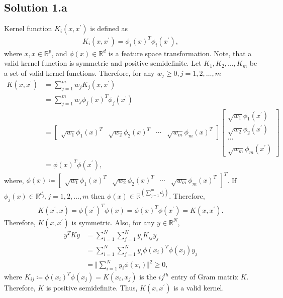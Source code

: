 \subsection*{Solution 1.a}
Kernel function $K_i(x, x^{\prime})$ is defined as
\begin{align*}
	K_i(x, x^{\prime}) = \phi_i(x)^T\phi_i(x^{\prime}),
\end{align*}
where $x, x \in \mathbb{R}^p$, and  $\phi(x) \in \mathbb{R}^d$ is a feature space transformation. Note, that a valid kernel function is symmetric and positive semidefinite. Let $K_1, K_2, \ldots, K_m$ be a set of valid kernel functions. Therefore, for any $w_j \geq 0, j=1,2,\ldots,m$
\begin{align*}
	K(x, x^{\prime}) &= \sum_{j=1}^m w_j K_j(x, x^{\prime})\\
	&= \sum_{j=1}^m w_j \phi_j(x)^T\phi_j(x^{\prime})\\
	&= \begin{bmatrix}\sqrt{w_1}\phi_1(x)^T & \sqrt{w_2}\phi_2(x)^T & \cdots & \sqrt{w_m}\phi_m(x)^T\end{bmatrix}\begin{bmatrix}\sqrt{w_1}\phi_1(x^{\prime}) \\ \sqrt{w_2}\phi_2(x^{\prime}) \\ \cdots \\ \sqrt{w_m}\phi_m(x^{\prime})\end{bmatrix}\\
	&= \phi(x)^T\phi(x^{\prime}),
\end{align*}
where, $\phi(x) \coloneqq \begin{bmatrix}\sqrt{w_1}\phi_1(x)^T & \sqrt{w_2}\phi_2(x)^T & \cdots & \sqrt{w_m}\phi_m(x)^T\end{bmatrix}^T$. If $\phi_j(x) \in \mathbb{R}^{d_j}, j=1,2,\ldots,m$ then $\phi(x) \in \mathbb{R}^{(\sum_{j=1}^m d_j)}$. Therefore,
\begin{align*}
	K(x^{\prime}, x) = \phi(x^{\prime})^T\phi(x) = \phi(x)^T\phi(x^{\prime}) = K(x, x^{\prime}).
\end{align*}
Therefore, $K(x, x^{\prime})$ is symmetric. Also, for any $y \in \mathbb{R}^N$,
\begin{align*}
	y^TKy &= \sum_{i=1}^N\sum_{j=1}^N y_iK_{ij}y_j\\
	&= \sum_{i=1}^N\sum_{j=1}^N y_i\phi(x_i)^T\phi(x_j)y_j\\
	&= \Vert \sum_{i=1}^N y_i \phi(x_i) \Vert^2 \geq 0,
\end{align*}
where $K_{ij} \coloneqq \phi(x_i)^T\phi(x_j) = K(x_i, x_j)$ is the $ij^{th}$ entry of Gram matrix $K$. Therefore, $K$ is positive semidefinite. Thus, $K(x, x^{\prime})$ is a valid kernel.
